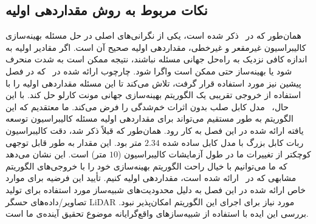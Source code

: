 \subsection{نکات مربوط به روش مقداردهی اولیه}
همان‌طور که در~\cite{khorrambakht2023graph} ذکر شده است، یکی از نگرانی‌های اصلی در حل مسئله بهینه‌سازی کالیبراسیون غیرمقعر و غیرخطی، مقداردهی اولیه صحیح آن است. اگر مقادیر اولیه به اندازه کافی نزدیک به راه‌حل جهانی مسئله نباشند، نتیجه ممکن است به شدت منحرف شود یا بهینه‌ساز حتی ممکن است واگرا شود. چارچوب ارائه شده در~\cite{khorrambakht2023graph} که در فصل پیشین نیز مورد استفاده قرار گرفت، تلاش می‌کند تا این مسئله مقداردهی اولیه را با استفاده از خروجی تقریبی یک الگوریتم بهینه‌سازی جهانی مونت کارلو حل کند. با این حال،~\cite{khorrambakht2023graph} مدل کابل صلب بدون اثرات خم‌شدگی را فرض می‌کند. ما معتقدیم که این الگوریتم به طور مستقیم می‌تواند برای مقداردهی اولیه مسئله کالیبراسیون توسعه یافته ارائه شده در این فصل به کار رود. همان‌طور که قبلاً ذکر شد، دقت کالیبراسیون ربات کابل بزرگ با مدل کابل ساده شده $2.34$ متر بود. این مقدار به طور قابل توجهی کوچکتر از تغییرات ما در طول آزمایشات کالیبراسیون ($10$ متر) است. این نشان می‌دهد که ما می‌توانیم با خیال راحت الگوریتم بهینه‌سازی خود را با خروجی‌های الگوریتم مشابهی که در~\cite{khorrambakht2023graph} ارائه شده است، مقداردهی اولیه کنیم. تأیید این فرضیه برای موارد خاص ارائه شده در این فصل به دلیل محدودیت‌های شبیه‌ساز مورد استفاده برای تولید تصاویر/داده‌های حسگر LiDAR مورد نیاز برای اجرای این الگوریتم امکان‌پذیر نبود. بررسی این ایده با استفاده از شبیه‌سازهای واقع‌گرایانه موضوع تحقیق آینده‌ی ما است.
